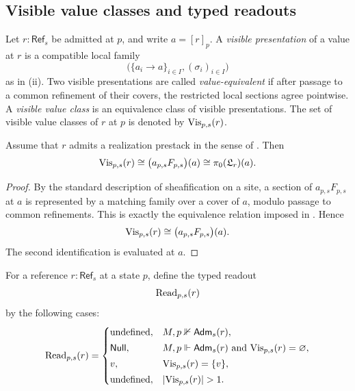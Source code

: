 \subsection{Visible value classes and typed readouts}

\begin{definition}\label{def:visible-value-classes}
Let $r:\mathsf{Ref}_s$ be admitted at $p$, and write $a=[r]_p$. A \emph{visible presentation} of a value at $r$ is a compatible local family
\[
\bigl(\{a_i\to a\}_{i\in I},(\sigma_i)_{i\in I}\bigr)
\]
as in (ii). Two visible presentations are called \emph{value-equivalent} if after passage to a common refinement of their covers, the restricted local sections agree pointwise. A \emph{visible value class} is an equivalence class of visible presentations. The set of visible value classes of $r$ at $p$ is denoted by $\mathrm{Vis}_{p,s}(r)$.
\end{definition}

\begin{theorem}\label{thm:visible-value-components}
Assume that $r$ admits a realization prestack in the sense of . Then
\[
\mathrm{Vis}_{p,s}(r)\cong \bigl(a_{p,s}F_{p,s}\bigr)(a)\cong \pi_0(\mathfrak L_r)(a).
\]
\end{theorem}

\begin{proof}
By the standard description of sheafification on a site, a section of $a_{p,s}F_{p,s}$ at $a$ is represented by a matching family over a cover of $a$, modulo passage to common refinements. This is exactly the equivalence relation imposed in . Hence
\[
\mathrm{Vis}_{p,s}(r)\cong \bigl(a_{p,s}F_{p,s}\bigr)(a).
\]
The second identification is  evaluated at $a$.
\end{proof}

\begin{definition}\label{def:typed-readout}
For a reference $r:\mathsf{Ref}_s$ at a state $p$, define the typed readout
\[
\mathrm{Read}_{p,s}(r)
\]
by the following cases:
\[
\Read_{p,s}(r)=
\begin{cases}
\text{undefined}, & M,p\nVdash \Adm_s(r),\\[0.5ex]
\Null, & M,p\Vdash \Adm_s(r)\ \text{and}\ \Vis_{p,s}(r)=\varnothing,\\[0.5ex]
v, & \Vis_{p,s}(r)=\{v\},\\[0.5ex]
\text{undefined}, & |\Vis_{p,s}(r)|>1.
\end{cases}
\]
\end{definition}

